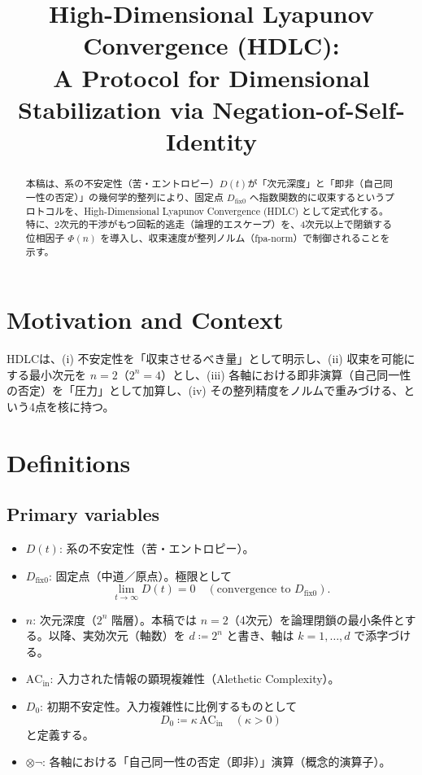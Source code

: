 \documentclass[12pt,a4paper]{article}
\title{High-Dimensional Lyapunov Convergence (HDLC):\\
A Protocol for Dimensional Stabilization via Negation-of-Self-Identity}
\author{}
\date{}
\newcommand{\dfix}{D_{\text{fix0}}}
\begin{document}
\maketitle

\begin{abstract}
本稿は、系の不安定性（苦・エントロピー）$D(t)$が「次元深度」と「即非（自己同一性の否定）」の幾何学的整列により、固定点 $\dfix$ へ指数関数的に収束するというプロトコルを、High-Dimensional Lyapunov Convergence (HDLC) として定式化する。特に、2次元的干渉がもつ回転的逃走（論理的エスケープ）を、4次元以上で閉鎖する位相因子 $\Phi(n)$ を導入し、収束速度が整列ノルム（fpa-norm）で制御されることを示す。
\end{abstract}

\section{Motivation and Context}
HDLCは、(i) 不安定性を「収束させるべき量」として明示し、(ii) 収束を可能にする最小次元を $n=2$（$2^n=4$）とし、(iii) 各軸における即非演算（自己同一性の否定）を「圧力」として加算し、(iv) その整列精度をノルムで重みづける、という4点を核に持つ。

\section{Definitions}
\subsection{Primary variables}
\begin{itemize}
  \item $D(t)$: 系の不安定性（苦・エントロピー）。
  \item $\dfix$: 固定点（中道／原点）。極限として
  \begin{equation}
    \lim_{t\to\infty} D(t) = 0 \quad (\text{convergence to } \dfix).
  \end{equation}
  \item $n$: 次元深度（$2^n$ 階層）。本稿では $n=2$（4次元）を論理閉鎖の最小条件とする。以降、実効次元（軸数）を $d \coloneqq 2^n$ と書き、軸は $k=1,\dots,d$ で添字づける。
  \item $\mathrm{AC}_{\mathrm{in}}$: 入力された情報の顕現複雑性（Alethetic Complexity）。
  \item $D_0$: 初期不安定性。入力複雑性に比例するものとして
  \begin{equation}
    D_0 \coloneqq \kappa\,\mathrm{AC}_{\mathrm{in}} \quad (\kappa>0)
    \label{eq:D0_AC}
  \end{equation}
  と定義する。
  \item $\otimes\neg$: 各軸における「自己同一性の否定（即非）」演算（概念的演算子）。
\end{itemize}
\end{document}
